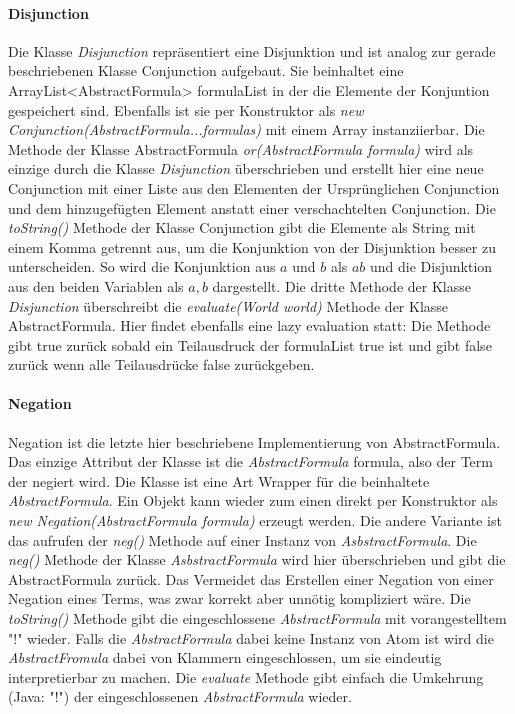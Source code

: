 \documentclass[12pt,a4paper]{article}
\begin{document}
\paragraph{Disjunction}


Die Klasse \textit{Disjunction} repräsentiert eine Disjunktion und ist analog zur gerade beschriebenen Klasse Conjunction aufgebaut. Sie beinhaltet eine ArrayList<AbstractFormula> formulaList in der die Elemente der Konjuntion gespeichert sind. Ebenfalls ist sie per Konstruktor als \textit{new Conjunction(AbstractFormula...formulas)}  mit einem Array instanziierbar. Die Methode der Klasse AbstractFormula \textit{or(AbstractFormula formula)} wird als einzige durch die Klasse \textit{Disjunction} überschrieben und erstellt hier eine neue Conjunction mit einer Liste aus den Elementen der Ursprünglichen Conjunction und dem hinzugefügten Element anstatt einer verschachtelten Conjunction. Die \textit{toString()} Methode der Klasse Conjunction gibt die Elemente als String mit einem Komma getrennt aus, um die Konjunktion von der Disjunktion besser zu unterscheiden. So wird die Konjunktion aus $a$ und $b$ als $ab$ und die Disjunktion aus den beiden Variablen als $a,b$ dargestellt. Die dritte Methode der Klasse \textit{Disjunction} überschreibt die \textit{evaluate(World world)} Methode der Klasse AbstractFormula. Hier findet ebenfalls eine lazy evaluation statt: Die Methode gibt true zurück sobald ein Teilausdruck der formulaList true ist und gibt false zurück wenn alle Teilausdrücke false zurückgeben.


\paragraph{Negation}


Negation ist die letzte hier beschriebene Implementierung von AbstractFormula. Das einzige Attribut der Klasse ist die \textit{AbstractFormula} formula, also der Term der negiert wird. Die Klasse ist eine Art Wrapper für die beinhaltete \textit{AbstractFormula}. Ein Objekt kann wieder zum einen direkt per Konstruktor als \textit{new Negation(AbstractFormula formula)} erzeugt werden. Die andere Variante ist das aufrufen der \textit{neg()} Methode auf einer Instanz von \textit{AsbstractFormula}. Die \textit{neg()} Methode der Klasse \textit{AsbstractFormula} wird hier überschrieben und gibt die AbstractFormula zurück. Das Vermeidet das Erstellen einer Negation von einer Negation eines Terms, was zwar korrekt aber unnötig kompliziert wäre. Die \textit{toString()} Methode gibt die eingeschlossene \textit{AbstractFormula} mit vorangestelltem "!" wieder. Falls die \textit{AbstractFormula} dabei keine Instanz von Atom ist wird die \textit{AbstractFromula} dabei von Klammern eingeschlossen, um sie eindeutig interpretierbar zu machen. Die \textit{evaluate} Methode gibt einfach die Umkehrung (Java: "!") der eingeschlossenen \textit{AbstractFormula} wieder.
\end{document}
